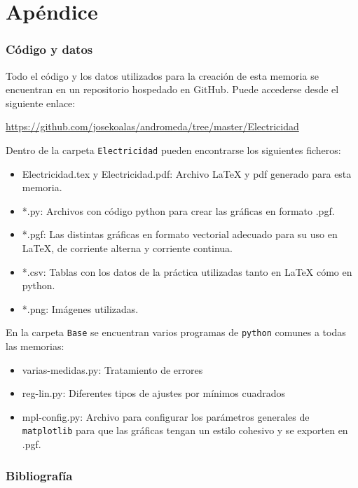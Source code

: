 \documentclass[12pt, a4paper, titlepage]{article}
\newcommand{\code}[1]{\texttt{#1}} %
\begin{document}
  \newpage
  \part*{Apéndice}

  \section*{Código y datos}

  Todo el código y los datos utilizados para la creación de esta memoria se encuentran en un repositorio hospedado en GitHub. Puede accederse desde el siguiente enlace:

  \url{https://github.com/josekoalas/andromeda/tree/master/Electricidad}

  Dentro de la carpeta \code{Electricidad} pueden encontrarse los siguientes ficheros:

  \begin{itemize}[label=$-$]
    \item Electricidad.tex y Electricidad.pdf: Archivo LaTeX y pdf generado para esta memoria.
    \item *.py: Archivos con código python para crear las gráficas en formato .pgf.
    \item *.pgf: Las distintas gráficas en formato vectorial adecuado para su uso en LaTeX, de corriente alterna y corriente continua.
    \item *.csv: Tablas con los datos de la práctica utilizadas tanto en LaTeX cómo en python.
    \item *.png: Imágenes utilizadas.
  \end{itemize}

  En la carpeta \code{Base} se encuentran varios programas de \code{python} comunes a todas las memorias:

  \begin{itemize}[label=$-$]
    \item varias-medidas.py: Tratamiento de errores
    \item reg-lin.py: Diferentes tipos de ajustes por mínimos cuadrados
    \item mpl-config.py: Archivo para configurar los parámetros generales de \code{matplotlib} para que las gráficas tengan un estilo cohesivo y se exporten en .pgf.
  \end{itemize}

  \section*{Bibliografía}
\end{document}
